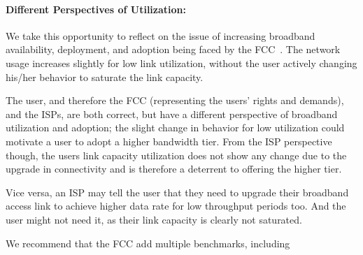 \paragraph{Different Perspectives of Utilization: }We take this opportunity to reflect on the issue of increasing broadband availability, deployment, and adoption being faced by the FCC~\cite{fcc2015progress-report}. The network usage increases slightly for low link utilization, without the user actively changing his/her behavior to saturate the link capacity.

The user, and therefore the FCC (representing the users' rights and demands), and the ISPs, are both correct, but have a different perspective of broadband utilization and adoption; the slight change in behavior for low utilization could motivate a user to adopt a higher bandwidth tier. From the ISP perspective though, the users link capacity utilization does not show any change due to the upgrade in connectivity and is therefore a deterrent to offering the higher tier.

Vice versa, an ISP may tell the user that they need to upgrade their broadband access link to achieve higher data rate for low throughput periods too. And the user might not need it, as their link capacity is clearly not saturated. 



We recommend that the FCC add multiple benchmarks, including 
